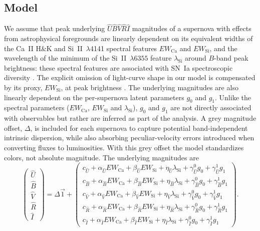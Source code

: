 \documentclass[trackchanges]{aastex62}   	%
\begin{document}
\subsection{Model}
We assume 
that  peak
underlying
 ${\hat{U}}{\hat{B}}\hat{V}\hat{R}\hat{I}$ magnitudes of a supernova  with effects from  astrophysical foregrounds are linearly dependent
on its
 equivalent widths of the Ca~II H\&K and Si~II~$\lambda$4141 spectral features
$EW_{\mathrm{Ca}}$ and $EW_{\mathrm{Si}}$,
and the wavelength of the minimum of 
the Si~II~$\lambda6355$ feature $\lambda_{\mathrm{Si}}$
around $B$-band peak brightness:
these spectral features are associated with SN~Ia  spectroscopic diversity  
\citep{2005ApJ...623.1011B, 2006PASP..118..560B, 2008A&A...492..535A, 2009A&A...500L..17B, 2009PASP..121..238B, 2009ApJ...699L.139W, 2011ApJ...729...55F,2012AJ....143..126B}.
The explicit omission of light-curve shape in our model is compensated by its proxy,
$EW_{\mathrm{Si}}$, at peak brightness
\citep{2008A&A...492..535A, 2011A&A...529L...4C}. 
The underlying magnitudes are also linearly dependent on the per-supernova latent parameters $g_0$ and $g_1$.
Unlike
the spectral parameters ($EW_{\mathrm{Ca}}$, $EW_{\mathrm{Si}}$ and $\lambda_{\mathrm{Si}}$),  $g_0$ and $g_1$ are not directly associated
with observables but rather are inferred as part of the analysis.
A grey magnitude offset, $\Delta$, is included for each supernova
to capture 
potential
band-independent intrinsic dispersion, while also absorbing peculiar-velocity errors introduced when converting
fluxes to luminosities.
With this grey offset the model standardizes colors, not absolute magnitude.
The underlying magnitudes are
\begin{equation}
\begin{pmatrix}
{\hat{U}}\\{\hat{B}}\\{\hat{V}}\\{\hat{R}}\\{\hat{I}}
\end{pmatrix}
=
\Delta \vec{1} +
\begin{pmatrix}
c_{\hat{U}}+\alpha_{\hat{U}} EW_{\mathrm{Ca}} + \beta_{\hat{U}} EW_{\mathrm{Si}} + \eta_{\hat{U}} \lambda_{\mathrm{Si}}  +\gamma^0_{{\hat{U}}} g_0 +\gamma^1_{{\hat{U}}} g_1 \\
c_{\hat{B}}+\alpha_{\hat{B}} EW_{\mathrm{Ca}} + \beta_{\hat{B}} EW_{\mathrm{Si}} + \eta_{\hat{B}} \lambda_{\mathrm{Si}}  +\gamma^0_{{\hat{B}}} g_0 +\gamma^1_{{\hat{B}}} g_1 \\
c_{\hat{V}}+\alpha_{\hat{V}} EW_{\mathrm{Ca}} + \beta_{\hat{V}} EW_{\mathrm{Si}} + \eta_{\hat{V}} \lambda_{\mathrm{Si}} +\gamma^0_{{\hat{V}}} g_0 +\gamma^1_{{\hat{V}}} g_1 \\
c_{\hat{R}}+\alpha_{\hat{R}} EW_{\mathrm{Ca}} + \beta_{\hat{R}} EW_{\mathrm{Si}} + \eta_{\hat{R}} \lambda_{\mathrm{Si}}  +\gamma^0_{{\hat{R}}} g_0 +\gamma^1_{{\hat{R}}} g_1 \\
c_{\hat{I}}+\alpha_{\hat{I}} EW_{\mathrm{Ca}} + \beta_{\hat{I}} EW_{\mathrm{Si}}+ \eta_{\hat{I}} \lambda_{\mathrm{Si}}  +\gamma^0_{{\hat{I}}} g_0 +\gamma^1_{{\hat{I}}} g_1
\end{pmatrix}.
\label{ewsiv:eqn}
\end{equation}
\end{document}
